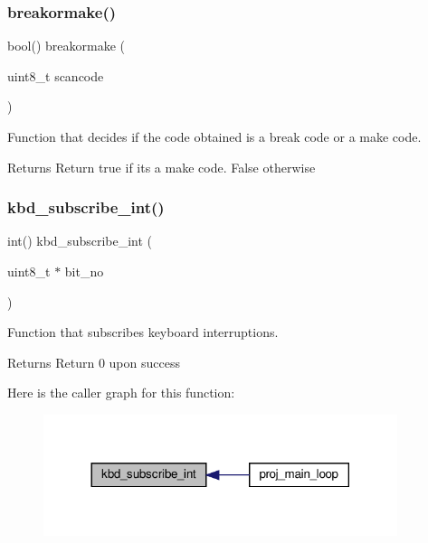 \subsubsection{\texorpdfstring{breakormake()}{breakormake()}}
{\footnotesize\ttfamily bool() breakormake (\begin{DoxyParamCaption}\item[{uint8\+\_\+t}]{scancode }\end{DoxyParamCaption})}



Function that decides if the code obtained is a break code or a make code. 

\begin{DoxyReturn}{Returns}
Return true if it\textquotesingle{}s a make code. False otherwise 
\end{DoxyReturn}
\mbox{\label{group__keyboard_ga4ac9231a99a664d6a9f0b69767e0d707}} 
\subsubsection{\texorpdfstring{kbd\+\_\+subscribe\+\_\+int()}{kbd\_subscribe\_int()}}
{\footnotesize\ttfamily int() kbd\+\_\+subscribe\+\_\+int (\begin{DoxyParamCaption}\item[{uint8\+\_\+t $\ast$}]{bit\+\_\+no }\end{DoxyParamCaption})}



Function that subscribes keyboard interruptions. 

\begin{DoxyReturn}{Returns}
Return 0 upon success 
\end{DoxyReturn}
Here is the caller graph for this function\+:\nopagebreak
\begin{figure}[H]
\begin{center}
\leavevmode
\includegraphics[width=293pt]{group__keyboard_ga4ac9231a99a664d6a9f0b69767e0d707_icgraph}
\end{center}
\end{figure}
\mbox{\label{group__keyboard_gaee0a7b54ee426fade9c780418d110fe0}} 
